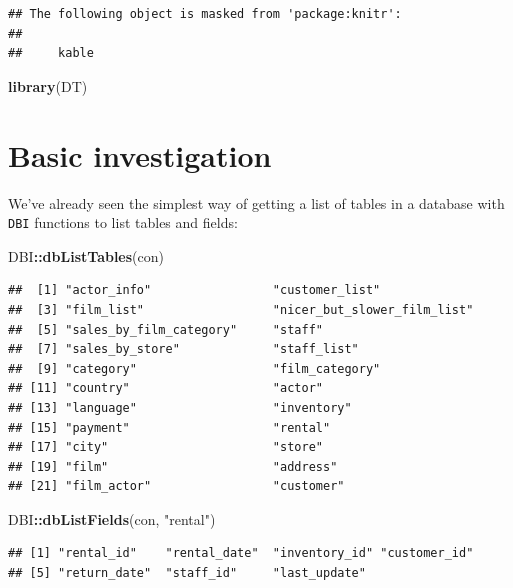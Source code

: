 \documentclass[]{book}
\newenvironment{Shaded}{\begin{snugshade}}{\end{snugshade}}
\newcommand{\KeywordTok}[1]{\textcolor[rgb]{0.13,0.29,0.53}{\textbf{#1}}}
\newcommand{\NormalTok}[1]{#1}
\newcommand{\OperatorTok}[1]{\textcolor[rgb]{0.81,0.36,0.00}{\textbf{#1}}}
\newcommand{\StringTok}[1]{\textcolor[rgb]{0.31,0.60,0.02}{#1}}
\theoremstyle{definition}
\theoremstyle{definition}
\theoremstyle{definition}
\theoremstyle{remark}
\begin{document}
\begin{verbatim}
## The following object is masked from 'package:knitr':
## 
##     kable
\end{verbatim}

\begin{Shaded}
\begin{Highlighting}[]
\KeywordTok{library}\NormalTok{(DT)}
\end{Highlighting}
\end{Shaded}

\hypertarget{basic-investigation}{%
\section{Basic investigation}\label{basic-investigation}}

We've already seen the simplest way of getting a list of tables in a
database with \texttt{DBI} functions to list tables and fields:

\begin{Shaded}
\begin{Highlighting}[]
\NormalTok{DBI}\OperatorTok{::}\KeywordTok{dbListTables}\NormalTok{(con)}
\end{Highlighting}
\end{Shaded}

\begin{verbatim}
##  [1] "actor_info"                 "customer_list"             
##  [3] "film_list"                  "nicer_but_slower_film_list"
##  [5] "sales_by_film_category"     "staff"                     
##  [7] "sales_by_store"             "staff_list"                
##  [9] "category"                   "film_category"             
## [11] "country"                    "actor"                     
## [13] "language"                   "inventory"                 
## [15] "payment"                    "rental"                    
## [17] "city"                       "store"                     
## [19] "film"                       "address"                   
## [21] "film_actor"                 "customer"
\end{verbatim}

\begin{Shaded}
\begin{Highlighting}[]
\NormalTok{DBI}\OperatorTok{::}\KeywordTok{dbListFields}\NormalTok{(con, }\StringTok{"rental"}\NormalTok{)}
\end{Highlighting}
\end{Shaded}

\begin{verbatim}
## [1] "rental_id"    "rental_date"  "inventory_id" "customer_id" 
## [5] "return_date"  "staff_id"     "last_update"
\end{verbatim}
\end{document}
